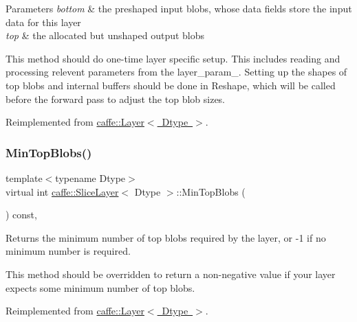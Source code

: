 \begin{DoxyParams}{Parameters}
{\em bottom} & the preshaped input blobs, whose data fields store the input data for this layer \\
\hline
{\em top} & the allocated but unshaped output blobs\\
\hline
\end{DoxyParams}
This method should do one-\/time layer specific setup. This includes reading and processing relevent parameters from the {\ttfamily layer\+\_\+param\+\_\+}. Setting up the shapes of top blobs and internal buffers should be done in {\ttfamily Reshape}, which will be called before the forward pass to adjust the top blob sizes. 

Reimplemented from \mbox{\hyperlink{classcaffe_1_1_layer_a481323a3e0972c682787f2137468c29f}{caffe\+::\+Layer$<$ Dtype $>$}}.

\mbox{\label{classcaffe_1_1_slice_layer_a2673c06234a234362c1e2592880567a1}} 
\subsubsection{\texorpdfstring{Min\+Top\+Blobs()}{MinTopBlobs()}\hspace{0.1cm}{\footnotesize\ttfamily [1/2]}}
{\footnotesize\ttfamily template$<$typename Dtype$>$ \\
virtual int \mbox{\hyperlink{classcaffe_1_1_slice_layer}{caffe\+::\+Slice\+Layer}}$<$ Dtype $>$\+::Min\+Top\+Blobs (\begin{DoxyParamCaption}{ }\end{DoxyParamCaption}) const\hspace{0.3cm}{\ttfamily [inline]}, {\ttfamily [virtual]}}



Returns the minimum number of top blobs required by the layer, or -\/1 if no minimum number is required. 

This method should be overridden to return a non-\/negative value if your layer expects some minimum number of top blobs. 

Reimplemented from \mbox{\hyperlink{classcaffe_1_1_layer_ab9e4c8d642e413948b131d851a8462a4}{caffe\+::\+Layer$<$ Dtype $>$}}.

\mbox{\label{classcaffe_1_1_slice_layer_a2673c06234a234362c1e2592880567a1}} 
